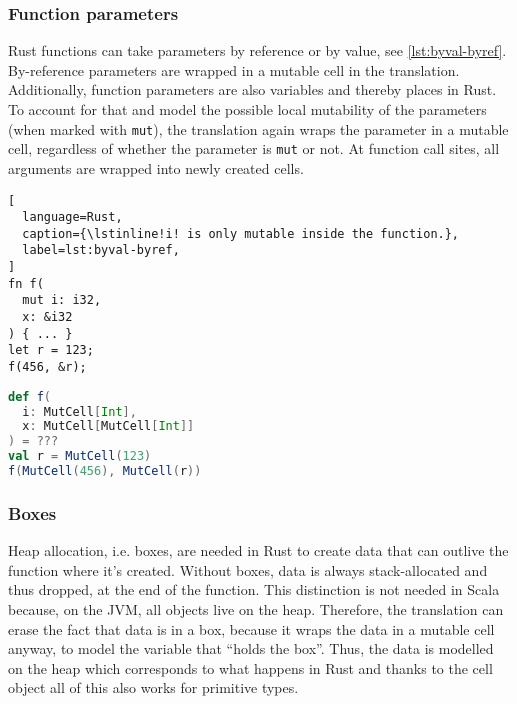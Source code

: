 \subsubsection{Function parameters}

Rust functions can take parameters by reference or by value, see
\autoref{lst:byval-byref}. By-reference parameters are wrapped in a mutable cell
in the translation. Additionally, function parameters are also variables and
thereby places in Rust. To account for that and model the possible local
mutability of the parameters (when marked with \lstinline!mut!), the translation
again wraps the parameter in a mutable cell, regardless of whether the parameter
is \lstinline!mut! or not. At function call sites, all arguments are wrapped
into newly created cells.

\noindent\begin{minipage}[t]{.48\textwidth}
\begin{lstlisting}[
  language=Rust,
  caption={\lstinline!i! is only mutable inside the function.},
  label=lst:byval-byref,
]
fn f(
  mut i: i32,
  x: &i32
) { ... }
let r = 123;
f(456, &r);
\end{lstlisting}
\end{minipage}\hfill
\begin{minipage}[t]{.48\textwidth}
\begin{lstlisting}[language=Scala, caption={This results in nested cell in Scala.}]
def f(
  i: MutCell[Int],
  x: MutCell[MutCell[Int]]
) = ???
val r = MutCell(123)
f(MutCell(456), MutCell(r))
\end{lstlisting}
\end{minipage}

\subsubsection{Boxes}

Heap allocation, i.e. boxes, are needed in Rust to create data that can outlive
the function where it's created. Without boxes, data is always stack-allocated
and thus dropped, at the end of the function. This distinction is not needed in
Scala because, on the JVM, all objects live on the heap. Therefore, the
translation can erase the fact that data is in a box, because it wraps the data
in a mutable cell anyway, to model the variable that ``holds the box''. Thus,
the data  is modelled on the heap which corresponds to what happens in Rust and
thanks to the cell object all of this also works for primitive types.

